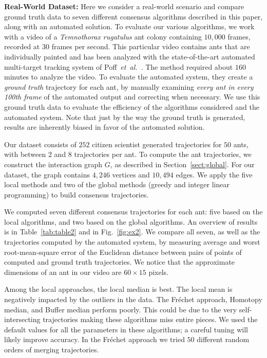 \documentclass{llncs}
\newcommand{\Frechet}[0]{Fr\'{e}chet}
\begin{document}
{\bf Real-World Dataset:}
Here we consider a real-world scenario and compare ground truth data
to seven different consensus algorithms described in this paper, along
with an automated solution.
To evaluate our various algorithms, we work with a video of a {\em
Temnothorax rugatulus} ant colony containing $10,000$ frames, recorded
at $30$ frames per second.
This particular video contains ants that are individually painted and
has been analyzed with the state-of-the-art automated multi-target tracking system of
Poff~{\em et~al.}~\cite{Poff12}. The method required about $160$ minutes to analyze
the video.
To evaluate the automated system,
they create a {\em ground truth} trajectory for each ant, by manually
examining \emph{every ant in every 100th frame} of the automated
output and correcting when necessary.
We use this ground truth data to evaluate the efficiency of the algorithms considered
and the automated system. Note that just by the
way the ground truth is generated, results are
inherently biased in favor of the automated solution.

Our dataset consists of $252$ citizen scientist generated
trajectories for $50$ ants, with between $2$ and $8$ trajectories per ant.
To compute the ant trajectories, we construct the interaction graph
$G$, as described in Section~\ref{sect:global}. For our dataset, the
graph contains $4,246$ vertices and $10,494$ edges.
We apply the five local methods and two of the global methods
(greedy and integer linear programming) to build consensus
trajectories.


We computed seven different consensus trajectories for each ant: five based on the local
algorithms, and two based on the global algorithms. An overview of
results is in Table~\ref{tab:table2} and in Fig.~\ref{fig:ex2}. We
compare all seven, as well as the trajectories computed by the
automated system, by measuring average and worst root-mean-square
error of the Euclidean distance between pairs of points of
computed  and ground truth trajectories. We notice that the approximate dimensions of an
ant in our video are $60\times 15$ pixels.


Among the local approaches, the local
median is best. The local mean is negatively impacted by the outliers in the data.
The \Frechet{} approach, Homotopy median, and Buffer median perform poorly.
This could be due to the very self-intersecting trajectories making these algorithms
miss entire pieces. We used the default values for all the parameters in
these algorithms; a careful tuning will likely improve accuracy.
In the \Frechet{} approach we tried $50$  different random orders of merging trajectories.
\end{document}
